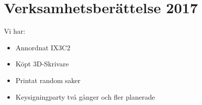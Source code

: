 \documentclass[a4paper,11pt,oneside]{article}
\begin{document}
\section*{Verksamhetsberättelse 2017}

Vi har: \\
\begin{itemize}
\item Annordnat IX3C2
\item Köpt 3D-Skrivare
\item Printat random saker
\item Keysigningparty två gånger och fler planerade
\end{itemize}
\end{document}
